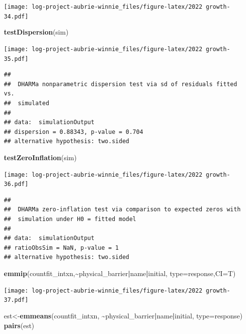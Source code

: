 \documentclass[
]{article}
\newenvironment{Shaded}{\begin{snugshade}}{\end{snugshade}}
\newcommand{\AttributeTok}[1]{\textcolor[rgb]{0.13,0.29,0.53}{#1}}
\newcommand{\FunctionTok}[1]{\textcolor[rgb]{0.13,0.29,0.53}{\textbf{#1}}}
\newcommand{\NormalTok}[1]{#1}
\newcommand{\OtherTok}[1]{\textcolor[rgb]{0.56,0.35,0.01}{#1}}
\newcommand{\SpecialCharTok}[1]{\textcolor[rgb]{0.81,0.36,0.00}{\textbf{#1}}}
\newcommand{\StringTok}[1]{\textcolor[rgb]{0.31,0.60,0.02}{#1}}
\begin{document}
\texttt{[image: log-project-aubrie-winnie\_files/figure-latex/2022 growth-34.pdf]}

\begin{Shaded}
\begin{Highlighting}[]
\FunctionTok{testDispersion}\NormalTok{(sim)}
\end{Highlighting}
\end{Shaded}

\texttt{[image: log-project-aubrie-winnie\_files/figure-latex/2022 growth-35.pdf]}

\begin{verbatim}
## 
##  DHARMa nonparametric dispersion test via sd of residuals fitted vs.
##  simulated
## 
## data:  simulationOutput
## dispersion = 0.88343, p-value = 0.704
## alternative hypothesis: two.sided
\end{verbatim}

\begin{Shaded}
\begin{Highlighting}[]
\FunctionTok{testZeroInflation}\NormalTok{(sim)}
\end{Highlighting}
\end{Shaded}

\texttt{[image: log-project-aubrie-winnie\_files/figure-latex/2022 growth-36.pdf]}

\begin{verbatim}
## 
##  DHARMa zero-inflation test via comparison to expected zeros with
##  simulation under H0 = fitted model
## 
## data:  simulationOutput
## ratioObsSim = NaN, p-value = 1
## alternative hypothesis: two.sided
\end{verbatim}

\begin{Shaded}
\begin{Highlighting}[]
\FunctionTok{emmip}\NormalTok{(countfit\_intxn,}\SpecialCharTok{\textasciitilde{}}\NormalTok{physical\_barrier}\SpecialCharTok{|}\NormalTok{name}\SpecialCharTok{|}\NormalTok{initial, }\AttributeTok{type=}\StringTok{\textquotesingle{}response\textquotesingle{}}\NormalTok{,}\AttributeTok{CI=}\NormalTok{T)}
\end{Highlighting}
\end{Shaded}

\texttt{[image: log-project-aubrie-winnie\_files/figure-latex/2022 growth-37.pdf]}

\begin{Shaded}
\begin{Highlighting}[]
\NormalTok{est}\OtherTok{\textless{}{-}}\FunctionTok{emmeans}\NormalTok{(countfit\_intxn, }\SpecialCharTok{\textasciitilde{}}\NormalTok{physical\_barrier}\SpecialCharTok{|}\NormalTok{name}\SpecialCharTok{|}\NormalTok{initial, }\AttributeTok{type=}\StringTok{\textquotesingle{}response\textquotesingle{}}\NormalTok{)}
\FunctionTok{pairs}\NormalTok{(est)}
\end{Highlighting}
\end{Shaded}
\end{document}
